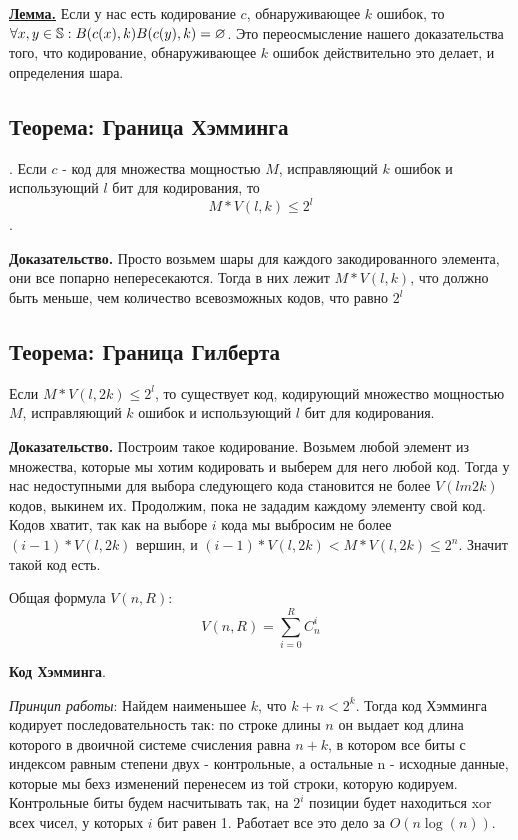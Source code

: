 \documentclass{article}
\begin{document}
\underline{\textbf{Лемма.}} Если у нас есть кодирование $c$, обнаруживающее $k$ ошибок, то $\forall x,y \in \mathbb{S}: B(c(x), k) \mathclap{} B(c(y),k) = \varnothing$. Это переосмысление нашего доказательства того, что кодирование, обнаруживающее $k$ ошибок действительно это делает, и определения шара.

\subsection{Теорема: Граница Хэмминга}. Если $c$  - код для множества мощностью $M$, исправляющий $k$ ошибок и использующий $l$ бит для кодирования, то $$M*V(l, k)\leq 2^l$$. 

\textbf{Доказательство.} Просто возьмем шары для каждого закодированного элемента, они все попарно непересекаются. Тогда в них лежит $M*V(l, k)$, что должно быть меньше, чем количество всевозможных кодов, что равно $2^l$

\subsection{Теорема: Граница Гилберта} Если $M*V(l, 2k)\leq 2^l$, то существует код, кодирующий множество мощностью $M$, исправляющий $k$ ошибок и использующий $l$ бит для кодирования.  

\textbf{Доказательство.} Построим такое кодирование. Возьмем любой элемент из множества, которые мы хотим кодировать и выберем для него любой код. Тогда у нас недоступными для выбора следующего кода становится не более $V(lm 2k)$ кодов, выкинем их. Продолжим, пока не зададим каждому элементу свой код. Кодов хватит, так как на выборе $i$ кода мы выбросим не более $(i - 1)*V(l, 2k)$ вершин, и $(i - 1)*V(l, 2k) < M*V(l, 2k)\leq 2^n$. Значит такой код есть.

Общая формула $V(n, R)$: $$V(n, R) = \sum\limits_{i=0}^{R} C_n^i$$

\textbf{Код Хэмминга}. 

\textit{Принцип работы}: Найдем наименьшее $k$, что $k + n < 2^k$. Тогда код Хэмминга кодирует последовательность так: по строке длины $n$ он выдает код длина которого в двоичной системе счисления равна $n + k$, в котором все биты с индексом равным степени двух - контрольные, а остальные n - исходные данные, которые мы бехз изменений перенесем из той строки, которую кодируем. Контрольные биты будем насчитывать так, на $2^i$ позиции будет находиться xor всех чисел, у которых $i$ бит равен 1. Работает все это дело за $O(n\log(n))$.
\end{document}
